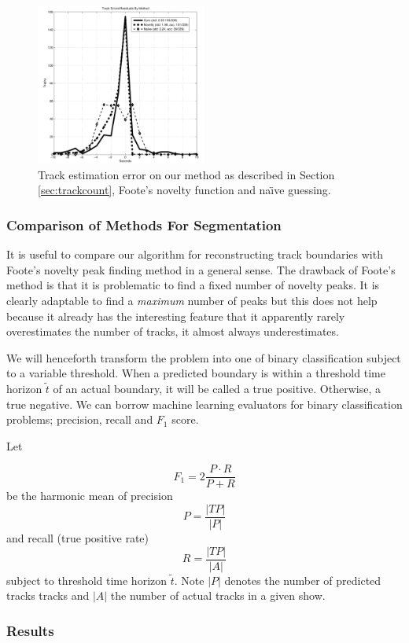 \documentclass[twocolumn]{article}
\begin{document}
\begin{figure}
	\centering
	\includegraphics[width=0.5\textwidth]{images/trackshift}
	\caption{Track estimation error on our method as described in Section \ref{sec:trackcount}, Foote's novelty function and na\"{\i}ve guessing. }
	\label{fig:track_shift}
\end{figure}

\subsubsection{Comparison of Methods For Segmentation}

It is useful to compare our algorithm for reconstructing track boundaries with Foote's novelty peak finding method in a general sense. The drawback of Foote's method is that it is problematic to find a fixed number of novelty peaks. It is clearly adaptable to find a \textit{maximum} number of peaks but this does not help because it already has the interesting feature that it apparently rarely overestimates the number of tracks, it almost always underestimates.

We will henceforth transform the problem into one of binary classification subject to a variable threshold. When a predicted boundary is within a threshold time horizon $\tilde t$ of an actual boundary, it will be called a true positive. Otherwise, a true negative. We can borrow machine learning evaluators for binary classification problems; precision, recall and $F_1$ score.

Let

\[
F_1 = 2\frac{P \cdot R}{P+R}
\] be the harmonic mean of precision 
\[
P = \frac{|TP|}{|P|}
\]
 and recall (true positive rate)
\[
R=\frac{|TP|}{|A|}
\] subject to threshold time horizon $\tilde t$. Note $|P|$ denotes the number of predicted tracks tracks and $|A|$ the number of actual tracks in a given show.

\subsubsection{Results}
\end{document}
